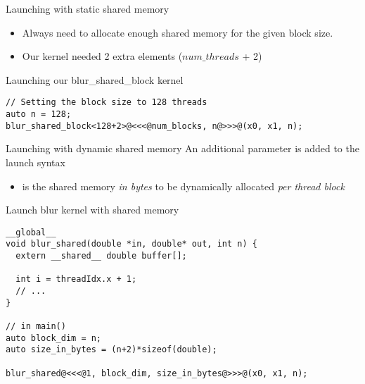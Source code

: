 \documentclass[aspectratio=43]{beamer}
\begin{document}
\begin{frame}[fragile]{Launching with static shared memory}
    \begin{itemize}
        \item Always need to allocate enough shared memory for the given block size.
        \item Our  kernel needed 2 extra elements ($num\_threads$ + 2)
    \end{itemize}
    \smallskip

    \begin{code}{Launching our blur\_shared\_block kernel}
        \begin{lstlisting}[style=boxcudatiny]
// Setting the block size to 128 threads
auto n = 128;
blur_shared_block<128+2>@<<<@num_blocks, n@>>>@(x0, x1, n);
        \end{lstlisting}
    \end{code}
\end{frame}

\begin{frame}[fragile]{Launching with dynamic shared memory}
        An additional parameter is added to the launch syntax
        \\
        \centering {}
        \begin{itemize}
            \item {} is the shared memory \emph{in bytes} to be dynamically allocated \emph{per thread block}
        \end{itemize}

    \begin{code}{Launch blur kernel with shared memory}
        \begin{lstlisting}[style=boxcudatiny]
__global__
void blur_shared(double *in, double* out, int n) {
  extern __shared__ double buffer[];

  int i = threadIdx.x + 1;
  // ...
}

// in main()
auto block_dim = n;
auto size_in_bytes = (n+2)*sizeof(double);

blur_shared@<<<@1, block_dim, size_in_bytes@>>>@(x0, x1, n);
        \end{lstlisting}
    \end{code}

\end{frame}
\end{document}
